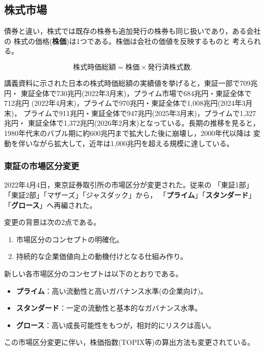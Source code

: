 \subsection{株式市場}

債券と違い，株式では既存の株券も追加発行の株券も同じ扱いであり，ある会社の
株式の価格(\textbf{株価})は1つである。株価は会社の価値を反映するものと
考えられる。

\begin{definition}[株式時価総額]
\[
\text{株式時価総額} = \text{株価} \times \text{発行済株式数}.
\]
\end{definition}

講義資料に示された日本の株式時価総額の実績値を挙げると，東証一部で709兆円・
東証全体で730兆円(2022年3月末)，プライム市場で684兆円・東証全体で712兆円
(2022年4月末)，プライムで970兆円・東証全体で1,008兆円(2024年3月末)，
プライムで911兆円・東証全体で947兆円(2025年3月末)，プライムで1,327兆円・
東証全体で1,372兆円(2026年2月末)となっている。長期の推移を見ると，
1980年代末のバブル期に約600兆円まで拡大した後に崩壊し，2000年代以降は
変動を伴いながら拡大して，近年は1,000兆円を超える規模に達している。

\subsubsection{東証の市場区分変更}

2022年4月4日，東京証券取引所の市場区分が変更された。従来の
「東証1部」「東証2部」「マザーズ」「ジャスダック」から，
「\textbf{プライム}」「\textbf{スタンダード}」「\textbf{グロース}」へ再編された。

変更の背景は次の2点である。
\begin{enumerate}
\item 市場区分のコンセプトの明確化。
\item 持続的な企業価値向上の動機付けとなる仕組み作り。
\end{enumerate}

新しい各市場区分のコンセプトは以下のとおりである。
\begin{itemize}
\item \textbf{プライム}：高い流動性と高いガバナンス水準(の企業向け)。
\item \textbf{スタンダード}：一定の流動性と基本的なガバナンス水準。
\item \textbf{グロース}：高い成長可能性をもつが，相対的にリスクは高い。
\end{itemize}

この市場区分変更に伴い，株価指数(TOPIX等)の算出方法も変更されている。

